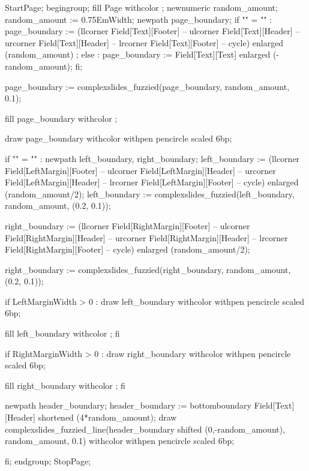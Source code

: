   StartPage;
  begingroup;
  fill Page withcolor ;
  newnumeric random_amount; random_amount := 0.75EmWidth;
  newpath page_boundary; 
  if "\currentmakeup" = "" :
      page_boundary := (llcorner Field[Text][Footer]
                     -- ulcorner Field[Text][Header]
                     -- urcorner Field[Text][Header]
                     -- lrcorner Field[Text][Footer]
                     -- cycle)
                     enlarged (random_amount) ;
  else :
      page_boundary := Field[Text][Text] enlarged (-random_amount);
  fi;

  page_boundary := complexslides_fuzzied(page_boundary, random_amount, 0.1);

  fill page_boundary withcolor ;

  draw page_boundary withcolor  
       withpen pencircle scaled 6bp;

  if "\currentmakeup" = "" :
     newpath left_boundary, right_boundary;
      left_boundary := (llcorner Field[LeftMargin][Footer]
                     -- ulcorner Field[LeftMargin][Header]
                     -- urcorner Field[LeftMargin][Header]
                     -- lrcorner Field[LeftMargin][Footer]
                     -- cycle)
                     enlarged (random_amount/2);
      left_boundary  := complexslides_fuzzied(left_boundary, random_amount, (0.2, 0.1));

      right_boundary := (llcorner Field[RightMargin][Footer]
                      -- ulcorner Field[RightMargin][Header]
                      -- urcorner Field[RightMargin][Header]
                      -- lrcorner Field[RightMargin][Footer]
                      -- cycle)
                      enlarged (random_amount/2);

      right_boundary := complexslides_fuzzied(right_boundary, random_amount, (0.2, 0.1));
      
     if LeftMarginWidth > 0 :
        draw left_boundary 
           withcolor 
           withpen pencircle scaled 6bp;

       fill left_boundary withcolor ;
     fi

     if RightMarginWidth > 0 :
        draw right_boundary 
           withcolor 
           withpen pencircle scaled 6bp;

       fill right_boundary withcolor ;
     fi

     newpath header_boundary;
     header_boundary := bottomboundary Field[Text][Header] shortened (4*random_amount);
     draw complexslides_fuzzied_line(header_boundary shifted (0,-random_amount),
                                     random_amount, 0.1)
           withcolor 
           withpen pencircle scaled 6bp;

  fi;
  endgroup;
  StopPage;
\stopuseMPgraphic


\setupbackgrounds[\v!page][\c!background={complexslides:pagebackground}]


\protect

\stopmodule

